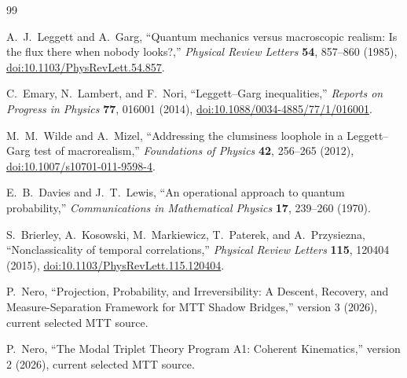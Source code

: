 \documentclass[11pt]{article}
\theoremstyle{definition}
\theoremstyle{remark}
\begin{document}
\begingroup
\raggedright
\begin{thebibliography}{99}

A.~J.~Leggett and A.~Garg,
``Quantum mechanics versus macroscopic realism: Is the flux there when nobody
looks?,''
\emph{Physical Review Letters} \textbf{54}, 857--860 (1985),
\href{https://doi.org/10.1103/PhysRevLett.54.857}
{doi:10.1103/PhysRevLett.54.857}.

C.~Emary, N.~Lambert, and F.~Nori,
``Leggett--Garg inequalities,''
\emph{Reports on Progress in Physics} \textbf{77}, 016001 (2014),
\href{https://doi.org/10.1088/0034-4885/77/1/016001}
{doi:10.1088/0034-4885/77/1/016001}.

M.~M.~Wilde and A.~Mizel,
``Addressing the clumsiness loophole in a Leggett--Garg test of
macrorealism,''
\emph{Foundations of Physics} \textbf{42}, 256--265 (2012),
\href{https://doi.org/10.1007/s10701-011-9598-4}
{doi:10.1007/s10701-011-9598-4}.

E.~B.~Davies and J.~T.~Lewis,
``An operational approach to quantum probability,''
\emph{Communications in Mathematical Physics} \textbf{17}, 239--260 (1970).

S.~Brierley, A.~Kosowski, M.~Markiewicz, T.~Paterek, and A.~Przysiezna,
``Nonclassicality of temporal correlations,''
\emph{Physical Review Letters} \textbf{115}, 120404 (2015),
\href{https://doi.org/10.1103/PhysRevLett.115.120404}
{doi:10.1103/PhysRevLett.115.120404}.

P.~Nero,
``Projection, Probability, and Irreversibility: A Descent, Recovery, and
Measure-Separation Framework for MTT Shadow Bridges,'' version 3 (2026),
current selected MTT source.

P.~Nero,
``The Modal Triplet Theory Program A1: Coherent Kinematics,'' version 2
(2026), current selected MTT source.

\end{thebibliography}
\endgroup
\end{document}
